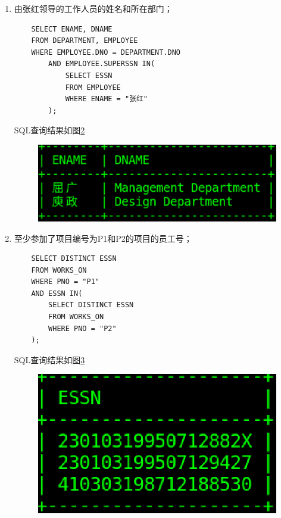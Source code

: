 \documentclass{ML}
\begin{document}
\begin{enumerate}
\begin{figure}[htb]
        \caption{}\label{fig:3}
    \end{figure}
    \item 由张红领导的工作人员的姓名和所在部门；
    \begin{verbatim}
    SELECT ENAME, DNAME
    FROM DEPARTMENT, EMPLOYEE
    WHERE EMPLOYEE.DNO = DEPARTMENT.DNO 
        AND EMPLOYEE.SUPERSSN IN(
            SELECT ESSN
            FROM EMPLOYEE
            WHERE ENAME = "张红"
        );
    \end{verbatim}
    SQL查询结果如图\ref{fig:4}
    \begin{figure}[htb]
        \centering
        \includegraphics[scale=0.4, bb=0 0 383 124]{media/3.1.4.eps}
        \caption{}\label{fig:4}
    \end{figure}
    \item 至少参加了项目编号为P1和P2的项目的员工号；
    \begin{verbatim}
    SELECT DISTINCT ESSN
    FROM WORKS_ON
    WHERE PNO = "P1" 
    AND ESSN IN(
        SELECT DISTINCT ESSN
        FROM WORKS_ON
        WHERE PNO = "P2"
    );
    \end{verbatim}
    SQL查询结果如图\ref{fig:5}
    \begin{figure}[htb]
        \centering
        \includegraphics[scale=0.4, bb=0 0 245 142]{media/3.1.5.eps}
        \caption{}\label{fig:5}
    \end{figure}

\end{enumerate}
\end{document}
